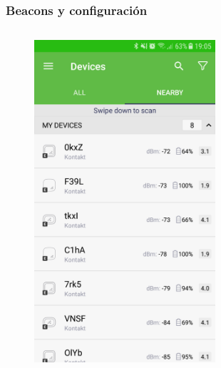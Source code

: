 \documentclass[mathserif]{beamer}
\begin{document}
\begin{frame}
\frametitle{Beacons y configuración}

\begin{columns}[t] %

\begin{figure}
\includegraphics[width=0.6\textwidth]{../figures/kontaktapp1.png}
\end{figure}


\end{columns}
\end{frame}
\end{document}
